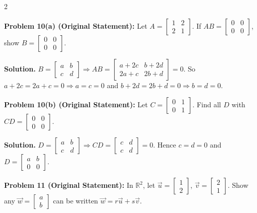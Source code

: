 \documentclass[8pt]{extarticle}
\begin{document}
\begin{multicols}{2}
\begin{tcolorbox}[title=]
\noindent
\textbf{Problem 10(a) (Original Statement):}\;
Let \(A=\begin{bmatrix}1&2\\2&1\end{bmatrix}\).
If \(AB=\begin{bmatrix}0&0\\0&0\end{bmatrix}\), show \(B=\begin{bmatrix}0&0\\0&0\end{bmatrix}\).

\textbf{Solution.}
\(B=\begin{bmatrix}a&b\\ c&d\end{bmatrix}\Rightarrow
AB=\begin{bmatrix}a+2c& b+2d\\ 2a+c&2b+d\end{bmatrix}=0\).
So \(a+2c=2a+c=0\Rightarrow a=c=0\) and \(b+2d=2b+d=0\Rightarrow b=d=0\).

\medskip
\textbf{Problem 10(b) (Original Statement):}\;
Let \(C=\begin{bmatrix}0&1\\0&1\end{bmatrix}\).
Find all \(D\) with \(CD=\begin{bmatrix}0&0\\0&0\end{bmatrix}\).

\textbf{Solution.}
\(D=\begin{bmatrix}a&b\\ c&d\end{bmatrix}\Rightarrow
CD=\begin{bmatrix}c&d\\ c&d\end{bmatrix}=0\).
Hence \(c=d=0\) and \(D=\begin{bmatrix}a&b\\ 0&0\end{bmatrix}\).
\end{tcolorbox}

\begin{tcolorbox}[title=]
\noindent
\textbf{Problem 11 (Original Statement):}  
In \(\mathbb{R}^{2}\), let
\(\vec{u}=\begin{bmatrix}1\\2\end{bmatrix}\),
\(\vec{v}=\begin{bmatrix}2\\1\end{bmatrix}\).
Show any \(\vec w=\begin{bmatrix}a\\b\end{bmatrix}\) can be written \(\vec w=r\vec u+s\vec v\).


\end{tcolorbox}
\end{multicols}
\end{document}
